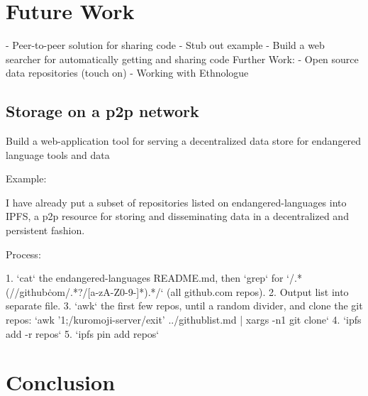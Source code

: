 \section{Future Work}\label{sec:future-work}


- Peer-to-peer solution for sharing code
  - Stub out example
  - Build a web searcher for automatically getting and sharing code
    Further Work:
  - Open source data repositories (touch on)
  - Working with Ethnologue


\subsection{Storage on a p2p network}

Build a web-application tool for serving a decentralized data store for endangered language tools and data

Example:

I have already put a subset of repositories listed on endangered-languages into IPFS, a p2p resource for storing and disseminating data in a decentralized and persistent fashion.

Process:

1. `cat` the endangered-languages README.md, then `grep` for `/.*(//github\.com/.*?/[a-zA-Z0-9-]*).*/` (all github.com repos).
2. Output list into separate file.
3. `awk` the first few repos, until a random divider, and clone the git repos: `awk '1;/kuromoji-server/{exit}' ../githublist.md | xargs -n1 git clone`
4. `ipfs add -r repos`
5. `ipfs pin add repos`




\section{Conclusion}\label{sec:conclusion}